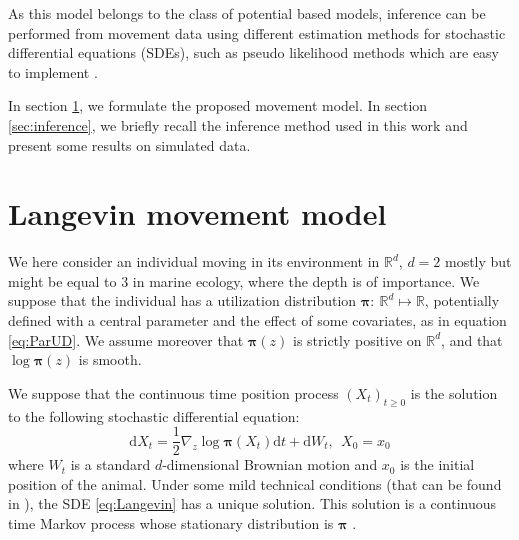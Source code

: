 \documentclass[10pt,a4paper, draft]{article}
\newcommand{\rmd}{\text{d}}
\newcommand{\ud}{\boldsymbol{\pi}}
\begin{document}
As this model belongs to the class of potential based models, inference can be performed from movement data using different estimation methods for stochastic differential equations (SDEs), such as pseudo likelihood methods which are easy to implement \citep{gloaguen2017stochastic}.

In section \ref{sec:model}, we formulate the proposed movement model. In section \ref{sec:inference}, we briefly recall the inference method used in this work and present some results on simulated data.
\section{Langevin movement model}
\label{sec:model}

We here consider an individual moving in its environment in $\mathbb{R}^d$, $d=2$ mostly but might be equal to $3$ in marine ecology, where the depth is of importance. We suppose that the individual has a utilization distribution $\ud:~\mathbb{R}^d  \mapsto  \mathbb{R}$, potentially defined with a central parameter and  the effect of some covariates, as in equation \eqref{eq:ParUD}. We assume moreover that $\ud(z)$ is strictly positive on $\mathbb{R}^d$, and that $\log \ud(z)$ is smooth.

We suppose that the continuous time position process $(X_t)_{t\geq 0}$ is the solution to the following stochastic differential equation:
\begin{equation}
\label{eq:Langevin}
\rmd X_t = \frac{1}{2}\nabla_z \log \ud(X_t) \rmd t + \rmd W_t,~~X_0 = x_0
\end{equation}
where $W_t$ is a standard $d$-dimensional Brownian motion and $x_0$ is the initial position of the animal. Under some mild technical conditions (that can be found in \citet{dalalyan2017theoretical}), the SDE  \eqref{eq:Langevin} has a unique solution. This solution is a continuous time Markov process whose stationary distribution is $\ud$ \citep{roberts1996exponential}. 
\end{document}
